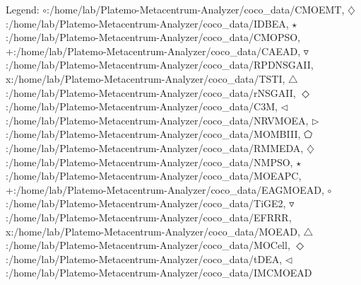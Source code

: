 Legend: {\color{CornflowerBlue}$\circ$}:/home/lab/Platemo-Metacentrum-Analyzer/coco\_data/CMOEMT, {{}$\diamondsuit$}:/home/lab/Platemo-Metacentrum-Analyzer/coco\_data/IDBEA, {\color{Green}$\star$}:/home/lab/Platemo-Metacentrum-Analyzer/coco\_data/CMOPSO, {\color{red}+}:/home/lab/Platemo-Metacentrum-Analyzer/coco\_data/CAEAD, {\color{brown}$\triangledown$}:/home/lab/Platemo-Metacentrum-Analyzer/coco\_data/RPDNSGAII, {{}x}:/home/lab/Platemo-Metacentrum-Analyzer/coco\_data/TSTI, {{}$\triangle$}:/home/lab/Platemo-Metacentrum-Analyzer/coco\_data/rNSGAII, {{}$\Diamond$}:/home/lab/Platemo-Metacentrum-Analyzer/coco\_data/C3M, {{}$\triangleleft$}:/home/lab/Platemo-Metacentrum-Analyzer/coco\_data/NRVMOEA, {{}$\triangleright$}:/home/lab/Platemo-Metacentrum-Analyzer/coco\_data/MOMBIII, {{}$\pentagon$}:/home/lab/Platemo-Metacentrum-Analyzer/coco\_data/RMMEDA, {{}$\diamondsuit$}:/home/lab/Platemo-Metacentrum-Analyzer/coco\_data/NMPSO, {{}$\star$}:/home/lab/Platemo-Metacentrum-Analyzer/coco\_data/MOEAPC, {{}+}:/home/lab/Platemo-Metacentrum-Analyzer/coco\_data/EAGMOEAD, {{}$\circ$}:/home/lab/Platemo-Metacentrum-Analyzer/coco\_data/TiGE2, {{}$\triangledown$}:/home/lab/Platemo-Metacentrum-Analyzer/coco\_data/EFRRR, {{}x}:/home/lab/Platemo-Metacentrum-Analyzer/coco\_data/MOEAD, {{}$\triangle$}:/home/lab/Platemo-Metacentrum-Analyzer/coco\_data/MOCell, {{}$\Diamond$}:/home/lab/Platemo-Metacentrum-Analyzer/coco\_data/tDEA, {{}$\triangleleft$}:/home/lab/Platemo-Metacentrum-Analyzer/coco\_data/IMCMOEAD